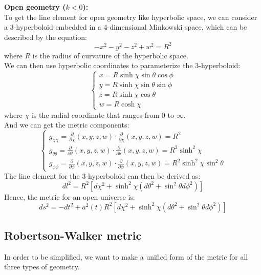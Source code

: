 \begin{theory}
    \textbf{Open geometry ($k < 0$):} \\
    To get the line element for open geometry like hyperbolic space, we can consider a 3-hyperboloid embedded in a 4-dimensional Minkowski space, which can be described by the equation:
    \[
        -x^2 - y^2 - z^2 + w^2 = R^2
    \]
    where $R$ is the radius of curvature of the hyperbolic space. \\
    We can then use hyperbolic coordinates to parameterize the 3-hyperboloid:
    \[
        \begin{cases}
            x = R \sinh\chi \sin\theta \cos\phi \\ 
            y = R \sinh\chi \sin\theta \sin\phi \\
            z = R \sinh\chi \cos\theta \\
            w = R \cosh\chi
        \end{cases}
    \]
    where $\chi$ is the radial coordinate that ranges from 0 to $\infty$. \\
    And we can get the metric components:
    \[
        \begin{cases}
            g_{\chi\chi} = \frac{\partial}{\partial \chi} (x, y, z, w) \cdot \frac{\partial}{\partial \chi} (x, y, z, w) = R^2 \\
            g_{\theta\theta} = \frac{\partial}{\partial \theta} (x, y, z, w) \cdot \frac{\partial}{\partial \theta} (x, y, z, w) = R^2 \sinh^2\chi \\
            g_{\phi\phi} = \frac{\partial}{\partial \phi} (x, y, z, w) \cdot \frac{\partial}{\partial \phi} (x, y, z, w) = R^2 \sinh^2\chi \sin^2\theta
        \end{cases}
    \]
    The line element for the 3-hyperboloid can then be derived as:
    \[
        dl^2 = R^2 \left[ d\chi^2 + \sinh^2\chi (d\theta^2 + \sin^2\theta d\phi^2) \right]
    \]
    Hence, the metric for an open universe is:
    \[
        ds^2 = -dt^2 + a^2(t) R^2 \left[ d\chi^2 + \sinh^2\chi (d\theta^2 + \sin^2\theta d\phi^2) \right]
    \]
\end{theory}

\newpage
\subsection{Robertson-Walker metric}
\begin{intuition}
    In order to be simplified, we want to make a unified form of the metric for all three types of geometry. \\
\end{intuition}

